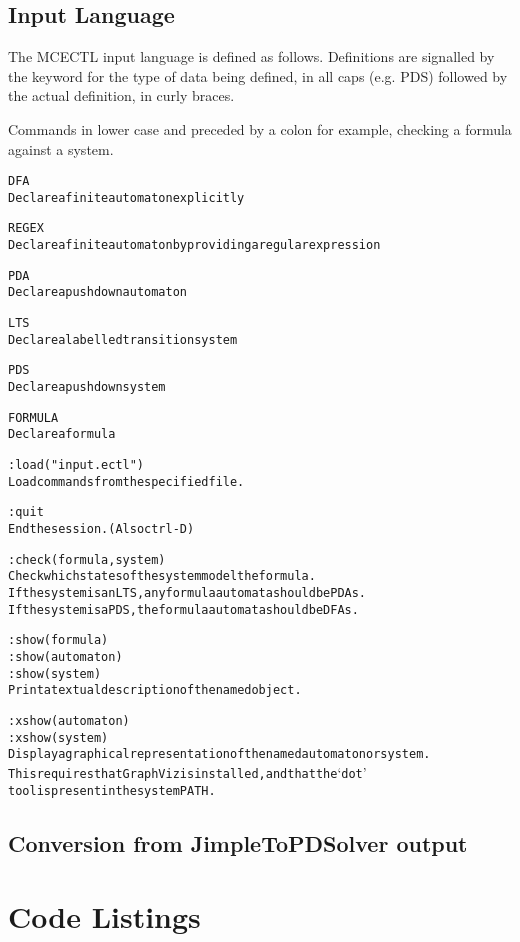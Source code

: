 \documentclass[11pt]{article}
\theoremstyle{definition}
\begin{document}
{\subsection{Input Language}

The MCECTL input language is defined as follows.
Definitions are signalled by the keyword for the type of data being defined, in
all caps (e.g. PDS) followed by the actual definition, in curly braces.

Commands in lower case and preceded by a colon 
for example, checking a formula against a system.

\begin{alltt}
DFA
Declare a finite automaton explicitly

REGEX
Declare a finite automaton by providing a regular expression

PDA
Declare a pushdown automaton

LTS
Declare a labelled transition system

PDS
Declare a pushdown system 

FORMULA
Declare a formula

:load("input.ectl")
Load commands from the specified file.

:quit
End the session. (Also ctrl-D)

:check(formula, system)
Check which states of the system model the formula.
If the system is an LTS, any formula automata should be PDAs.
If the system is a PDS, the formula automata should be DFAs.

:show(formula)
:show(automaton)
:show(system)
Print a textual description of the named object.

:xshow(automaton)
:xshow(system)
Display a graphical representation of the named automaton or system.
This requires that GraphViz is installed, and that the `dot'
tool is present in the system PATH.
\end{alltt}

\subsection{Conversion from JimpleToPDSolver output}





\section{Code Listings}


}
\end{document}
